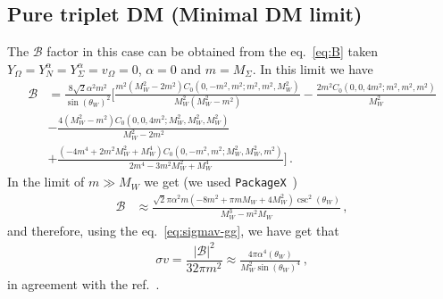 \documentclass[12pt,letterpaper]{article}
\begin{document}
\subsection{Pure triplet DM (Minimal DM limit)}
\label{sec:pure-triplet-sigmagg}
The $\mathcal{B}$ factor in this case can be obtained from the eq.~\ref{eq:B} taken $Y_{\Omega}=Y_{N}^{\alpha}=Y_{\Sigma}^{\alpha}=v_{\Omega}=0$, $\alpha =0$ and $m=M_{\Sigma}$. In this limit we have
%
\begin{align}
\mathcal{B} &=
\frac{8 \sqrt{2} \alpha ^2 m^2}{\sin(\theta_W)^2}
\bigg[
\frac{m^2 \left(M_W^2-2 m^2\right) C_0\left(0,-m^2,m^2;m^2,m^2,M_W^2\right)}{M_W^2 \left(M_W^2-m^2\right)}-\frac{2 m^2 C_0\left(0,0,4 m^2;m^2,m^2,m^2\right)}{M_W^2}\nonumber\\
&-\frac{4 \left(M_W^2-m^2\right) C_0\left(0,0,4
   m^2;M_W^2,M_W^2,M_W^2\right)}{M_W^2-2 m^2}\nonumber\\
   &+\frac{\left(-4 m^4+2 m^2 M_W^2+M_W^4\right) C_0\left(0,-m^2,m^2;M_W^2,M_W^2,m^2\right)}{2 m^4-3 m^2 M_W^2+M_W^4}
\bigg]\,.
\end{align}
In the limit of $m\gg M_W$ we get (we used \texttt{PackageX}~\cite{Patel:2015tea}) 
\begin{align}
\mathcal{B} 
&\approx \frac{\sqrt{2} \pi  \alpha ^2 m \left(-8 m^2+\pi  m M_W+4 M_W^2\right) \csc ^2\left(\theta _W\right)}{M_W^3-m^2 M_W}\,,
\end{align}
and therefore, using the eq.~\ref{eq:sigmav-gg}, we have get that 
\begin{align}
\sigma v = \dfrac{|\mathcal{B}|^2}{32\pi m^2}\approx
\frac{4 \pi  \alpha ^4 \left(\theta _W\right)}{M_W^2 \sin(\theta_W)^4}\,,
\end{align}
in agreement with the ref.~\cite{Cirelli:2005uq}.











\end{document}
